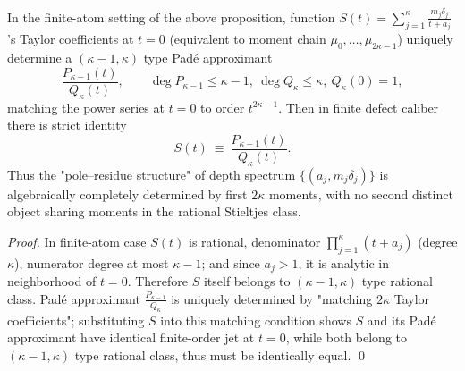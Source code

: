 \begin{corollary}\label{cor:xi-pade-hankel-exact-inversion}
In the finite-atom setting of the above proposition, function \(S(t)=\sum_{j=1}^{\kappa}\frac{m_j\delta_j}{t+a_j}\)'s Taylor coefficients at \(t=0\) (equivalent to moment chain \(\mu_0,\dots,\mu_{2\kappa-1}\)) uniquely determine a \((\kappa-1,\kappa)\) type Padé approximant
\[
\frac{P_{\kappa-1}(t)}{Q_{\kappa}(t)},
\qquad
\deg P_{\kappa-1}\le \kappa-1,\ \deg Q_{\kappa}\le \kappa,\ Q_{\kappa}(0)=1,
\]
matching the power series at \(t=0\) to order \(t^{2\kappa-1}\).
Then in finite defect caliber there is strict identity
\[
\boxed{\;
S(t)\ \equiv\ \frac{P_{\kappa-1}(t)}{Q_{\kappa}(t)}.\;}
\]
Thus the "pole--residue structure" of depth spectrum \(\{(a_j,m_j\delta_j)\}\) is algebraically completely determined by first \(2\kappa\) moments, with no second distinct object sharing moments in the rational Stieltjes class.
\end{corollary}
\begin{proof}
In finite-atom case \(S(t)\) is rational, denominator \(\prod_{j=1}^{\kappa}(t+a_j)\) (degree \(\kappa\)), numerator degree at most \(\kappa-1\);
and since \(a_j>1\), it is analytic in neighborhood of \(t=0\).
Therefore \(S\) itself belongs to \((\kappa-1,\kappa)\) type rational class.
Padé approximant \(\frac{P_{\kappa-1}}{Q_{\kappa}}\) is uniquely determined by "matching \(2\kappa\) Taylor coefficients";
substituting \(S\) into this matching condition shows \(S\) and its Padé approximant have identical finite-order jet at \(t=0\),
while both belong to \((\kappa-1,\kappa)\) type rational class, thus must be identically equal. \qed
\end{proof}

